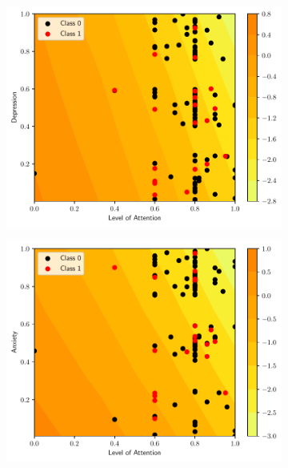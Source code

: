 \begin{figure}
    \centering
    \begin{subfigure}[b]{0.32\textwidth}
        \centering
        \includegraphics[width=\textwidth]{figs/svm-poly-contour-0-3.pdf}
        \caption{}
    \end{subfigure}
    \begin{subfigure}[b]{0.32\textwidth}
        \centering
        \includegraphics[width=\textwidth]{figs/svm-poly-contour-0-4.pdf}
        \caption{}
    \end{subfigure}
    \begin{subfigure}[b]{0.32\textwidth}

\end{subfigure}
\end{figure}
